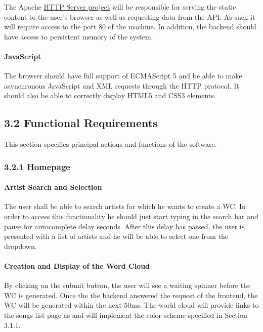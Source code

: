 \documentclass[]{article}
\begin{document}
The Apache \href{http://httpd.apache.org/}{HTTP Server project} will be
responsible for serving the static content to the user's browser as well
as requesting data from the API. As such it will require access to the
port 80 of the machine. In addition, the backend should have access to
persistent memory of the system.

\paragraph{JavaScript}\label{javascript}

The browser should have full support of ECMAScript 5 and be able to make
asynchronous JavaScript and XML requests through the HTTP protocol. It
should also be able to correctly display HTML5 and CSS3 elements.

\subsection{3.2 Functional Requirements}\label{functional-requirements}

This section specifies principal actions and functions of the software.

\subsubsection{3.2.1 Homepage}\label{homepage}

\paragraph{Artist Search and
Selection}\label{artist-search-and-selection}

The user shall be able to search artists for which he wants to create a
WC. In order to access this functionality he should just start typing in
the search bar and pause for autocomplete delay seconds. After this
delay has passed, the user is presented with a list of artists and he
will be able to select one from the dropdown.

\paragraph{Creation and Display of the Word
Cloud}\label{creation-and-display-of-the-word-cloud}

By clicking on the submit button, the user will see a waiting spinner
before the WC is generated. Once the the backend answered the request of
the frontend, the WC will be generated within the next 50ms. The world
cloud will provide links to the songs list page as and will implement
the color scheme specified in Section 3.1.1.
\end{document}
